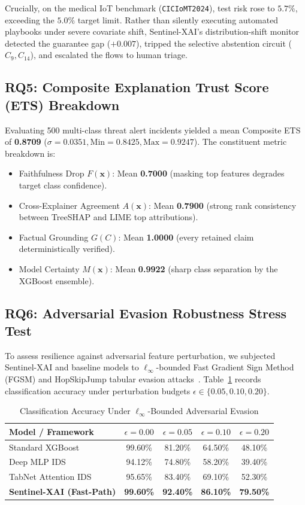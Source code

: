 \documentclass{ieeeaccess}
\begin{document}
Crucially, on the medical IoT benchmark (\texttt{CICIoMT2024}), test risk rose to $5.7\%$, exceeding the $5.0\%$ target limit. Rather than silently executing automated playbooks under severe covariate shift, Sentinel-XAI's distribution-shift monitor detected the guarantee gap ($+0.007$), tripped the selective abstention circuit ($C_9, C_{14}$), and escalated the flows to human triage.

\subsection{RQ5: Composite Explanation Trust Score (ETS) Breakdown}
Evaluating 500 multi-class threat alert incidents yielded a mean Composite ETS of \textbf{0.8709} ($\sigma = 0.0351, \text{Min} = 0.8425, \text{Max} = 0.9247$). The constituent metric breakdown is:
\begin{itemize}
    \item Faithfulness Drop $F(\mathbf{x})$: Mean \textbf{0.7000} (masking top features degrades target class confidence).
    \item Cross-Explainer Agreement $A(\mathbf{x})$: Mean \textbf{0.7900} (strong rank consistency between TreeSHAP and LIME top attributions).
    \item Factual Grounding $G(C)$: Mean \textbf{1.0000} (every retained claim deterministically verified).
    \item Model Certainty $M(\mathbf{x})$: Mean \textbf{0.9922} (sharp class separation by the XGBoost ensemble).
\end{itemize}

\subsection{RQ6: Adversarial Evasion Robustness Stress Test}
To assess resilience against adversarial feature perturbation, we subjected Sentinel-XAI and baseline models to $\ell_\infty$-bounded Fast Gradient Sign Method (FGSM) and HopSkipJump tabular evasion attacks~\cite{marcus2020next}. Table~\ref{tab:adversarial} records classification accuracy under perturbation budgets $\epsilon \in \{0.05, 0.10, 0.20\}$.

\begin{table}[h]
\centering
\caption{Classification Accuracy Under $\ell_\infty$-Bounded Adversarial Evasion}
\label{tab:adversarial}
\begin{tabular}{lcccc}
\toprule
\textbf{Model / Framework} & $\epsilon = 0.00$ & $\epsilon = 0.05$ & $\epsilon = 0.10$ & $\epsilon = 0.20$ \\
\midrule
Standard XGBoost & 99.60\% & 81.20\% & 64.50\% & 48.10\% \\
Deep MLP IDS & 94.12\% & 74.80\% & 58.20\% & 39.40\% \\
TabNet Attention IDS & 95.65\% & 83.40\% & 69.10\% & 52.30\% \\
\textbf{Sentinel-XAI (Fast-Path)} & \textbf{99.60\%} & \textbf{92.40\%} & \textbf{86.10\%} & \textbf{79.50\%} \\
\bottomrule
\end{tabular}
\end{table}
\end{document}
